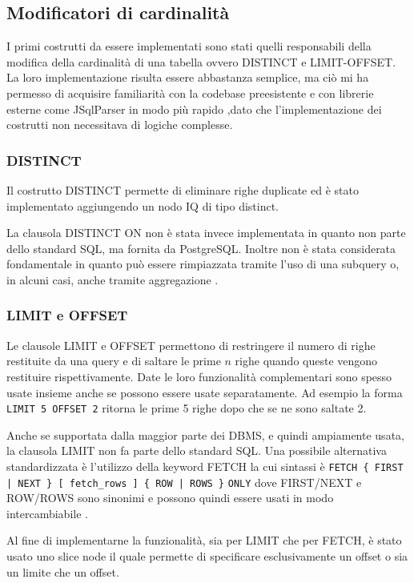 \subsection{Modificatori di cardinalità}
I primi costrutti da essere implementati sono stati quelli responsabili della modifica della cardinalità di una tabella ovvero DISTINCT e LIMIT-OFFSET. La loro implementazione
risulta essere abbastanza semplice, ma ciò mi ha permesso di acquisire familiarità con la codebase preesistente e con librerie esterne come JSqlParser
in modo più rapido ,dato che l'implementazione dei costrutti non necessitava di logiche complesse.

\subsubsection*{DISTINCT}
Il costrutto DISTINCT permette di eliminare righe duplicate ed è stato implementato aggiungendo un nodo IQ di tipo distinct.

La clausola DISTINCT ON non è stata invece implementata in quanto non parte dello standard SQL, ma fornita da PostgreSQL. Inoltre non è stata considerata fondamentale in quanto
può essere rimpiazzata tramite l'uso di una subquery o, in alcuni casi, anche tramite aggregazione \cite{PGDistinct}.
\subsubsection*{LIMIT e OFFSET}
Le clausole LIMIT e OFFSET permettono di restringere il numero di righe restituite da una query e di saltare le prime $n$ righe quando queste vengono restituire rispettivamente.
Date le loro funzionalità complementari sono spesso usate insieme anche se possono essere usate separatamente.
Ad esempio la forma \verb+LIMIT 5 OFFSET 2+ ritorna le prime 5 righe dopo che se ne sono saltate 2.

Anche se supportata dalla maggior parte dei DBMS, e quindi ampiamente usata, la clausola LIMIT non fa parte dello standard SQL. Una possibile alternativa standardizzata è l'utilizzo
della keyword FETCH la cui sintassi è \verb+FETCH { FIRST | NEXT } [ fetch_rows ] { ROW | ROWS }+ \verb+ONLY+ dove FIRST/NEXT e ROW/ROWS sono sinonimi e possono quindi essere usati
in modo intercambiabile \cite{Fetch}.

Al fine di implementarne la funzionalità, sia per LIMIT che per FETCH, è stato usato uno slice node il quale permette di specificare esclusivamente un offset o sia
un limite che un offset.

